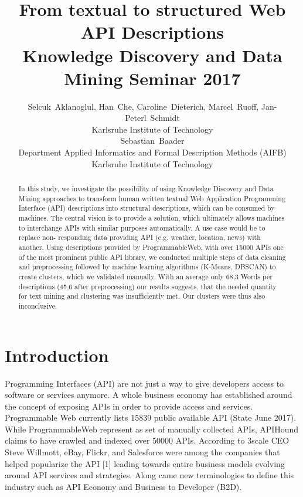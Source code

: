 \documentclass[a4paper]{IEEEtran}
\begin{document}
\title{From textual to structured Web API Descriptions\\ \large Knowledge Discovery and Data Mining Seminar 2017 }


\author{Selcuk~Aklanoglul,
        Han~Che,
        Caroline~Dieterich,
        Marcel~Ruoff,
        Jan-Peterl~Schmidt  \\
Karlsruhe Institute of Technology \\
Sebastian~Baader \\
Department Applied Informatics and  Formal Description Methods (AIFB)  \\
Karlsruhe Institute of Technology

}



\maketitle

\begin{abstract}
In this study, we investigate the possibility of using Knowledge Discovery and Data Mining approaches to transform human written textual Web Application Programming Interface
(API) descriptions into structural descriptions, which
can be consumed by machines. The central vision
is to provide a solution, which ultimately allows
machines to interchange APIs with similar purposes
automatically. A use case would be to replace non-
responding data providing API (e.g. weather,
location, news) with another. Using descriptions
provided by ProgrammableWeb, with over 15000
APIs one of the most prominent public API library,
we conducted multiple steps of data cleaning and
preprocessing followed by machine learning
algorithms (K-Means, DBSCAN) to create clusters,
which we validated manually. With an average only
68,3 Words per descriptions (45,6 after
preprocessing) our results suggests, that the
needed quantity for text mining and clustering was insufficiently met. Our clusters were thus also
inconclusive.
\end{abstract}


\IEEEpeerreviewmaketitle

\section{Introduction}
 Programming Interfaces (API) are not just a way to give developers access to software or services anymore. A whole business economy has established around the concept of exposing APIs in order to provide access and services. Programmable Web currently lists 15839 public available API (State June 2017). While ProgrammableWeb represent as set of manually collected APIs, APIHound claims to have crawled and indexed over 50000 APIs.
According to 3scale CEO Steve Willmott, eBay, Flickr, and Salesforce were among the companies that helped popularize the API [1] leading towards entire business models evolving around API services and strategies. Along came new terminologies to define this industry such as API Economy and Business to Developer (B2D).
\end{document}
